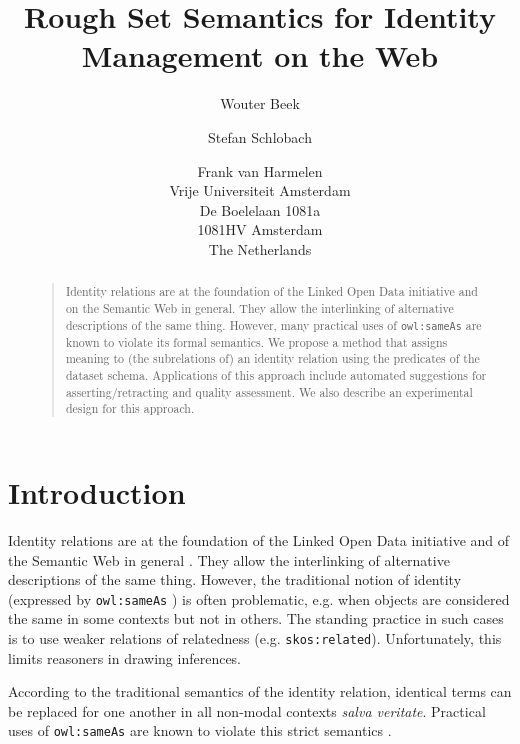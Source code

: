 \documentclass[letterpaper]{article}
\begin{document}
\title{Rough Set Semantics for Identity Management on the Web}
\author{Wouter Beek \and Stefan Schlobach \and Frank van Harmelen\\
Vrije Universiteit Amsterdam\\
De Boelelaan 1081a\\
1081HV Amsterdam\\
The Netherlands}
\maketitle
\begin{abstract}
\begin{quote}
Identity relations are at the foundation of the Linked Open Data initiative and on the Semantic Web in general. They allow the interlinking of alternative descriptions of the same thing. However, many practical uses of \verb|owl:sameAs| are known to violate its formal semantics. We propose a method that assigns meaning to (the subrelations of) an identity relation using the predicates of the dataset schema. Applications of this approach include automated suggestions for asserting/retracting and quality assessment. We also describe an experimental design for this approach.
\end{quote}
\end{abstract}

\section{Introduction}
\label{sec:introduction}

Identity relations are at the foundation of the Linked Open Data initiative and of the Semantic Web in general \cite{bizer_cyganiak_heath_2007}. They allow the interlinking of alternative descriptions of the same thing. However, the traditional notion of identity (expressed by \verb|owl:sameAs| \cite{motic_paterschneider_grau_2012}) is often problematic, e.g. when objects are considered the same in some contexts but not in others. The standing practice in such cases is to use weaker relations of relatedness (e.g. \verb|skos:related|). Unfortunately, this limits reasoners in drawing inferences.

According to the traditional semantics of the identity relation, identical terms can be replaced for one another in all non-modal contexts \emph{salva veritate}. Practical uses of \verb|owl:sameAs| are known to violate this strict semantics \cite{halpin_hayes_2010,halpin_hayes_mccusker_mcguinness_thompson_2010}.
\end{document}
